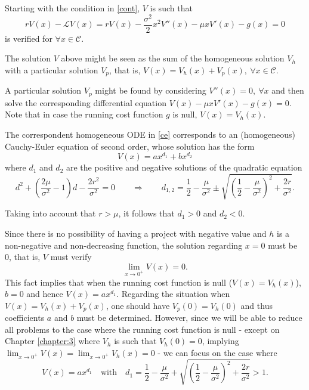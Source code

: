 Starting with the condition in \eqref{cont}, $V$ is such that
\begin{equation}
r V(x) - \mathcal{L} V(x)= r V(x)-\frac{\sigma^2}{2}x^2V''(x)-\mu x V'(x) -g(x) =0
\label{ce}
\end{equation}
is verified for $\forall x \in \mathcal{C}$.

The solution $V$ above might be seen as the sum of the homogeneous solution $V_h$ with a particular solution $V_p$, that is, $V(x)=V_h(x)+V_p(x), \ \forall x \in \mathcal{C}$.

A particular solution $V_p$ might be found by considering $V''(x)=0, \ \forall x$ and then solve the corresponding differential equation $V(x)-\mu x V'(x) -g(x)=0$.
Note that in case the running cost function $g$ is null, $V(x)=V_h(x)$.

The correspondent homogeneous ODE in \eqref{ce} corresponds to an (homogeneous) Cauchy-Euler equation of second order, whose solution has the form
$$ V(x)=ax^{d_1}+bx^{d_2}$$
where $d_1$ and $d_2$ are the positive and negative solutions of the quadratic equation
\begin{equation}
d^2+\left( \frac{2 \mu}{\sigma^2}-1 \right)d-\frac{2r^2}{\sigma^2}=0 \qquad  \Rightarrow \qquad   d_{1,2}= \frac{1}{2}-\frac{\mu}{\sigma^2} \pm \sqrt{\left( \frac{1}{2} -\frac{\mu}{\sigma^2} \right) ^2+ \frac{2r}{\sigma^2}}.
\label{d1d2}
\end{equation}

Taking into account that $r>\mu$, it follows that $d_1>0$ and $d_2<0$.

Since there is no possibility of having a project with negative value and $h$ is a non-negative and non-decreasing function, the solution regarding $x=0$ must be 0, that is, $V$ must verify
\begin{equation}
\lim_{x\rightarrow 0^+} V(x)=0.
\label{cond1}
\end{equation}
This fact implies that when the running cost function is null ($V(x)=V_h(x)$), $b=0$ and hence $V(x)=ax^{d_1}$. Regarding the situation when $V(x)=V_h(x)+V_p(x)$, one should have $V_p(0)=V_h(0)$ and thus coefficients $a$ and $b$ must be determined. However, since we will be able to reduce all problems to the case where the running cost function is null - except on Chapter \ref{chapter:3} where $V_h$ is such that $V_h(0)=0$, implying $\lim_{x\rightarrow 0^+} V(x)=\lim_{x\rightarrow 0^+} V_h(x)=0$ - we can focus on the case where
\begin{equation}
V(x)=ax^{d_1} \quad \text{with} \quad d_1=\frac{1}{2}-\frac{\mu}{\sigma^2} +\sqrt{\left( \frac{1}{2} -\frac{\mu}{\sigma^2} \right) ^2+ \frac{2r}{\sigma^2}}>1.
\label{d1}
\end{equation}


